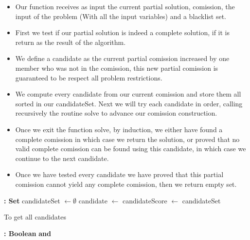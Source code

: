 \documentclass{article}
\begin{document}
\begin{itemize}
  \item Our function receives as input the current partial solution, comission, the input of the problem (With all the input variables) and a blacklist set.
  \item First we test if our partial solution is indeed a complete solution, if it is return as the result of the algorithm.
  \item We define a candidate as the current partial comission increased by one member who was not in the comission, this new partial comission is guaranteed to be respect all problem restrictions.
  \item We compute every candidate from our current comission and store them all sorted in our candidateSet. Next we will try each candidate in order, calling recursively the routine solve to advance our comission construction.
  \item Once we exit the function solve, by induction, we either have found a complete comission in which case we return the solution, or proved that no valid complete comission can be found using this candidate, in which case we continue to the next candidate.
  \item Once we have tested every candidate we have proved that this partial comission cannot yield any complete comission, then we return empty set.
\end{itemize}

\begin{algorithmic}[H]
 \textbf{: Set}
    \State candidateSet $\gets \emptyset$
        \State candidate $\gets$ 
            \State candidateScore $\gets$ 
            \State {}
            \State {}
        \EndIf
    \EndFor
    \State {}
    \State \Return candidateSet
\EndFunction
\end{algorithmic}

To get all candidates 

\begin{algorithmic}[H]
 \textbf{: Boolean}
    \State \Return {} \textbf{and}  
\EndFunction
\end{algorithmic}
\end{document}
